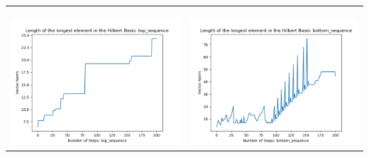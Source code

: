 \documentclass[10pt]{article}
\begin{document}
\begin{tabular}{c|c}
\begin{minipage}{.45\textwidth}
\end{minipage} \\ \\
\hline \\\begin{minipage}{.45\textwidth}
\includegraphics[width=\textwidth]{"DATA/5d/6 generators 2 bound A/top_sequence LENGTH"}
\end{minipage} &
\begin{minipage}{.45\textwidth}
\includegraphics[width=\textwidth]{"DATA/5d/6 generators 2 bound A bottomup/bottom_sequence LENGTH"}
\end{minipage}
\end{tabular}
\end{document}
